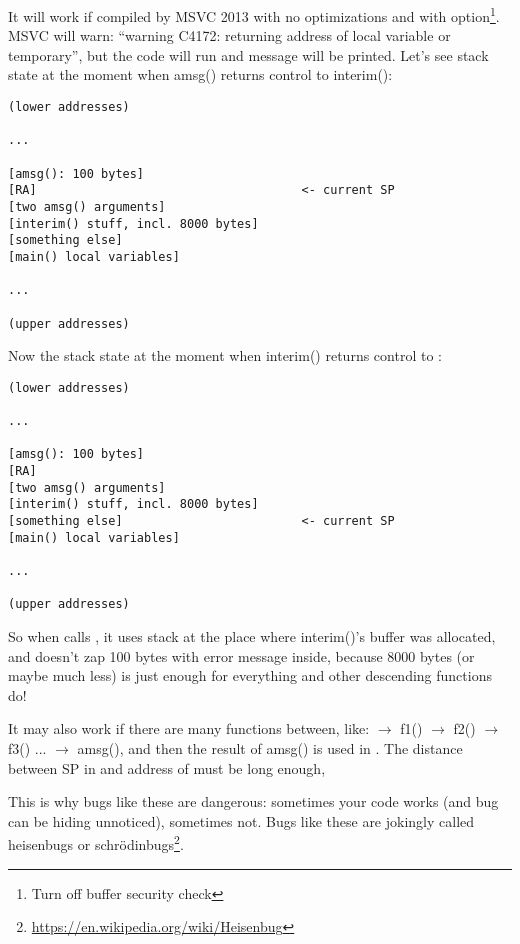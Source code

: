 It will work if compiled by MSVC 2013 with no optimizations and with  option\footnote{Turn off buffer security check}.
MSVC will warn: ``warning C4172: returning address of local variable or temporary'', but the code will run and message
will be printed.
Let's see stack state at the moment when amsg() returns control to interim():

\begin{lstlisting}
(lower addresses)

...

[amsg(): 100 bytes]
[RA]                                     <- current SP
[two amsg() arguments]
[interim() stuff, incl. 8000 bytes]
[something else]
[main() local variables]

...

(upper addresses)
\end{lstlisting}

Now the stack state at the moment when interim() returns control to \main{}:

\begin{lstlisting}
(lower addresses)

...

[amsg(): 100 bytes]
[RA]
[two amsg() arguments]
[interim() stuff, incl. 8000 bytes]
[something else]                         <- current SP
[main() local variables]

...

(upper addresses)
\end{lstlisting}

So when \main calls \printf, it uses stack at the place where interim()'s buffer was allocated,
and doesn't zap 100 bytes with error message inside, because 8000 bytes (or maybe much less) is just enough for everything
\printf and other descending functions do!

It may also work if there are many functions between, like:
\main $\rightarrow$ f1() $\rightarrow$ f2() $\rightarrow$ f3() ... $\rightarrow$ amsg(),
and then the result of amsg() is used in \main.
The distance between \ac{SP} in \main and address of  must be long enough,

This is why bugs like these are dangerous: sometimes your code works (and bug can be hiding unnoticed), sometimes not.
\label{heisenbug}
Bugs like these are jokingly called heisenbugs or schrödinbugs\footnote{\url{https://en.wikipedia.org/wiki/Heisenbug}}.

